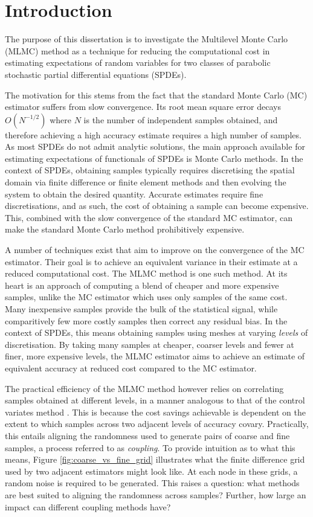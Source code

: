 \chapter{Introduction}\label{sec:intro}

The purpose of this dissertation is to investigate the 
Multilevel Monte Carlo (MLMC) method as a technique for reducing 
the computational cost in estimating expectations of random variables 
for two classes of parabolic stochastic partial differential equations (SPDEs).

The motivation for this stems from the fact that the standard Monte Carlo 
(MC) estimator suffers from slow convergence. Its root mean square error 
decays $O(N^{-1/2})$ where $N$ is the number 
of independent samples obtained, and therefore achieving a high accuracy 
estimate requires a high number of samples. As most SPDEs do not admit 
analytic solutions, the main approach available for estimating expectations of 
functionals of SPDEs is Monte Carlo methods. In the context
of SPDEs, obtaining samples typically requires discretising 
the spatial domain via finite difference or finite element methods
and then evolving the system to obtain the desired quantity. Accurate 
estimates require fine discretisations, and as such, the cost of obtaining 
a sample can become expensive. This, combined with the slow convergence of the 
standard MC estimator, can make the standard Monte Carlo method prohibitively
expensive.

A number of techniques exist that aim to improve on the convergence of 
the MC estimator. Their goal is to achieve an equivalent variance in their estimate 
at a reduced computational cost. The MLMC method is one such method. 
At its heart is an approach of computing a blend of cheaper and more expensive
samples, unlike the MC estimator which uses only samples of the same cost.
Many inexpensive samples provide the bulk of the statistical signal, 
while comparitively few more costly samples then correct any residual bias.
In the context of SPDEs, this means obtaining samples using meshes at 
varying \textit{levels} of discretisation. By taking many samples at cheaper,
coarser levels and fewer at finer, more expensive levels, the MLMC 
estimator aims to achieve an estimate of equivalent accuracy at reduced cost
compared to the MC estimator.

The practical efficiency of the MLMC method however relies on correlating 
samples obtained at different levels, in a manner analogous to that of the 
control variates method \cite{giles2015multilevel}. 
This is because the cost savings achievable is dependent on the extent to which 
samples across two adjacent levels of accuracy covary. Practically, this 
entails aligning the randomness used to generate pairs of coarse and 
fine samples, a process referred to as \textit{coupling}.
To provide intuition as to what this means, Figure
\ref{fig:coarse_vs_fine_grid} illustrates what the finite difference 
grid used by two adjacent estimators might look like. At each 
node in these grids, a random noise is required to be generated. 
This raises a question: what methods are best suited to aligning the 
randomness across samples? Further, how large an impact 
can different coupling methods have?

